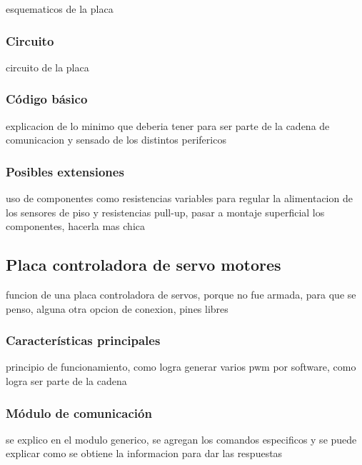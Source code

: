 esquematicos de la placa

\subsubsection{Circuito}
\label{h_placas_sensado_circuito}

circuito de la placa

\subsubsection{C\'odigo b\'asico}
\label{h_placas_sensado_codigo}

explicacion de lo minimo que deberia tener para ser parte de la cadena de comunicacion y sensado de los distintos perifericos

\subsubsection{Posibles extensiones}
\label{h_placas_sensado_extensiones}

uso de componentes como resistencias variables para regular la alimentacion de los sensores de piso y resistencias pull-up, pasar a montaje superficial los componentes, hacerla mas chica

\subsection{Placa controladora de servo motores}
\label{h_placas_servos}

funcion de una placa controladora de servos, porque no fue armada, para que se penso, alguna otra opcion de conexion, pines libres

\subsubsection{Caracter\'isticas principales}
\label{h_placas_servos_caracteristicas}

principio de funcionamiento, como logra generar varios pwm por software, como logra ser parte de la cadena

\subsubsection{M\'odulo de comunicaci\'on}
\label{h_placas_servos_comm}

se explico en el modulo generico, se agregan los comandos especificos y se puede explicar como se obtiene la informacion para dar las respuestas

